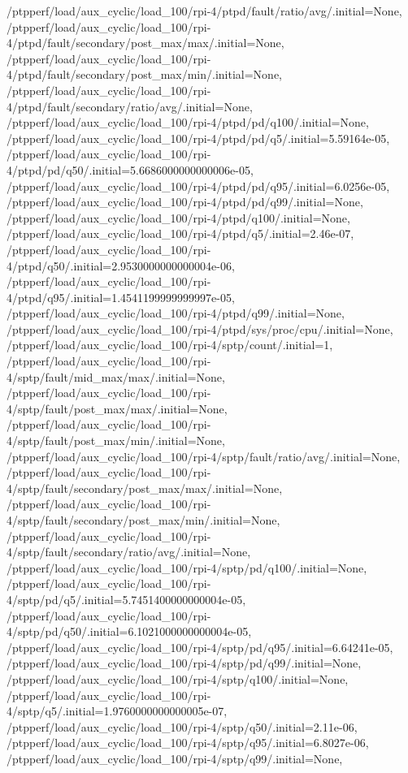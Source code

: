 {    /ptpperf/load/aux_cyclic/load_100/rpi-4/ptpd/fault/ratio/avg/.initial=None,
    /ptpperf/load/aux_cyclic/load_100/rpi-4/ptpd/fault/secondary/post_max/max/.initial=None,
    /ptpperf/load/aux_cyclic/load_100/rpi-4/ptpd/fault/secondary/post_max/min/.initial=None,
    /ptpperf/load/aux_cyclic/load_100/rpi-4/ptpd/fault/secondary/ratio/avg/.initial=None,
    /ptpperf/load/aux_cyclic/load_100/rpi-4/ptpd/pd/q100/.initial=None,
    /ptpperf/load/aux_cyclic/load_100/rpi-4/ptpd/pd/q5/.initial=5.59164e-05,
    /ptpperf/load/aux_cyclic/load_100/rpi-4/ptpd/pd/q50/.initial=5.6686000000000006e-05,
    /ptpperf/load/aux_cyclic/load_100/rpi-4/ptpd/pd/q95/.initial=6.0256e-05,
    /ptpperf/load/aux_cyclic/load_100/rpi-4/ptpd/pd/q99/.initial=None,
    /ptpperf/load/aux_cyclic/load_100/rpi-4/ptpd/q100/.initial=None,
    /ptpperf/load/aux_cyclic/load_100/rpi-4/ptpd/q5/.initial=2.46e-07,
    /ptpperf/load/aux_cyclic/load_100/rpi-4/ptpd/q50/.initial=2.9530000000000004e-06,
    /ptpperf/load/aux_cyclic/load_100/rpi-4/ptpd/q95/.initial=1.4541199999999997e-05,
    /ptpperf/load/aux_cyclic/load_100/rpi-4/ptpd/q99/.initial=None,
    /ptpperf/load/aux_cyclic/load_100/rpi-4/ptpd/sys/proc/cpu/.initial=None,
    /ptpperf/load/aux_cyclic/load_100/rpi-4/sptp/count/.initial=1,
    /ptpperf/load/aux_cyclic/load_100/rpi-4/sptp/fault/mid_max/max/.initial=None,
    /ptpperf/load/aux_cyclic/load_100/rpi-4/sptp/fault/post_max/max/.initial=None,
    /ptpperf/load/aux_cyclic/load_100/rpi-4/sptp/fault/post_max/min/.initial=None,
    /ptpperf/load/aux_cyclic/load_100/rpi-4/sptp/fault/ratio/avg/.initial=None,
    /ptpperf/load/aux_cyclic/load_100/rpi-4/sptp/fault/secondary/post_max/max/.initial=None,
    /ptpperf/load/aux_cyclic/load_100/rpi-4/sptp/fault/secondary/post_max/min/.initial=None,
    /ptpperf/load/aux_cyclic/load_100/rpi-4/sptp/fault/secondary/ratio/avg/.initial=None,
    /ptpperf/load/aux_cyclic/load_100/rpi-4/sptp/pd/q100/.initial=None,
    /ptpperf/load/aux_cyclic/load_100/rpi-4/sptp/pd/q5/.initial=5.7451400000000004e-05,
    /ptpperf/load/aux_cyclic/load_100/rpi-4/sptp/pd/q50/.initial=6.1021000000000004e-05,
    /ptpperf/load/aux_cyclic/load_100/rpi-4/sptp/pd/q95/.initial=6.64241e-05,
    /ptpperf/load/aux_cyclic/load_100/rpi-4/sptp/pd/q99/.initial=None,
    /ptpperf/load/aux_cyclic/load_100/rpi-4/sptp/q100/.initial=None,
    /ptpperf/load/aux_cyclic/load_100/rpi-4/sptp/q5/.initial=1.9760000000000005e-07,
    /ptpperf/load/aux_cyclic/load_100/rpi-4/sptp/q50/.initial=2.11e-06,
    /ptpperf/load/aux_cyclic/load_100/rpi-4/sptp/q95/.initial=6.8027e-06,
    /ptpperf/load/aux_cyclic/load_100/rpi-4/sptp/q99/.initial=None,
}
